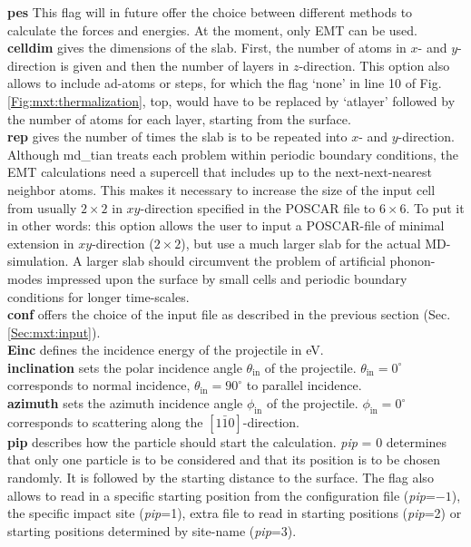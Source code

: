 \documentclass[twoside, 11pt, titlepage, captions=nooneline, a4paper, headsepline]{scrbook}%
\begin{document}
\textbf{pes} This flag will in future offer the choice between different methods to calculate the forces and energies. At the moment, only EMT can be used.\\
\textbf{celldim} gives the dimensions of the slab. First, the number of atoms in $x$- and $y$-direction is given and then the number of layers in $z$-direction. This option also allows to include ad-atoms or steps, for which the flag `none' in line 10 of Fig.\,\ref{Fig:mxt:thermalization}, top, would have to be replaced by `atlayer' followed by the number of atoms for each layer, starting from the surface.\\
\textbf{rep} gives the number of times the slab is to be repeated into $x$- and $y$-direction. Although md\_tian treats each problem within periodic boundary conditions, the EMT calculations need a supercell that includes up to the next-next-nearest neighbor atoms. This makes it necessary to increase the size of the input cell from usually $2\times2$ in $xy$-direction specified in the POSCAR file to $6\times6$. To put it in other words: this option allows the user to input a POSCAR-file of minimal extension in $xy$-direction ($2\times2$), but use a much larger slab for the actual MD-simulation. A larger slab should circumvent the problem of artificial phonon-modes impressed upon the surface by small cells and periodic boundary conditions for longer time-scales.\\
\textbf{conf} offers the choice of the input file as described in the previous section (Sec.\,\ref{Sec:mxt:input}).\\
\textbf{Einc} defines the incidence energy of the projectile in eV.\\
\textbf{inclination} sets the polar incidence angle $\theta_\mathrm{in}$ of the projectile. $\theta_\mathrm{in}=0^\circ$ corresponds to normal incidence, $\theta_\mathrm{in}=90^\circ$ to parallel incidence.\\
\textbf{azimuth} sets the azimuth incidence angle $\phi_\mathrm{in}$ of the projectile. $\phi_\mathrm{in}=0^\circ$ corresponds to scattering along the $[1\bar{1}0]$-direction.\\
\textbf{pip} describes how the particle should start the calculation. \textit{pip} = 0 determines that only one particle is to be considered and that its position is to be chosen randomly. It is followed by the starting distance to the surface. The flag also allows to read in a specific starting position from the configuration file (\textit{pip}=$-1$), the specific impact site (\textit{pip}=1), extra file to read in starting positions (\textit{pip}=2) or starting positions determined by site-name (\textit{pip}=3).
\end{document}
